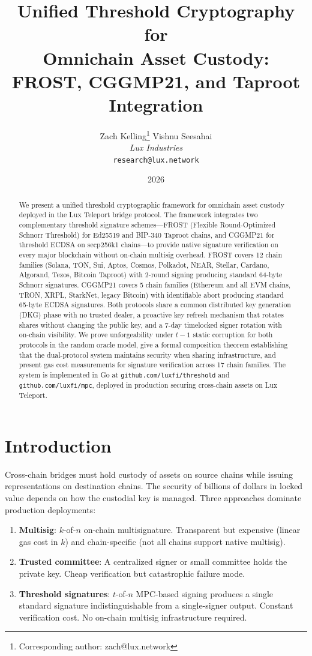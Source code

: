 \documentclass[11pt,twocolumn]{article}
\title{\textbf{Unified Threshold Cryptography for\\Omnichain Asset Custody:\\FROST, CGGMP21, and Taproot Integration}}
\author{
Zach Kelling\thanks{Corresponding author: zach@lux.network}
\quad
Vishnu Seesahai\\
\textit{Lux Industries}\\
\texttt{research@lux.network}
}
\date{2026}
\begin{document}
\luxcoverpage

\begin{abstract}
We present a unified threshold cryptographic framework for omnichain asset custody
deployed in the Lux Teleport bridge protocol. The framework integrates two complementary
threshold signature schemes---FROST (Flexible Round-Optimized Schnorr Threshold) for
Ed25519 and BIP-340 Taproot chains, and CGGMP21 for threshold ECDSA on secp256k1
chains---to provide native signature verification on every major blockchain without
on-chain multisig overhead. FROST covers 12 chain families (Solana, TON, Sui, Aptos,
Cosmos, Polkadot, NEAR, Stellar, Cardano, Algorand, Tezos, Bitcoin Taproot) with
2-round signing producing standard 64-byte Schnorr signatures. CGGMP21 covers 5 chain
families (Ethereum and all EVM chains, TRON, XRPL, StarkNet, legacy Bitcoin) with
identifiable abort producing standard 65-byte ECDSA signatures. Both protocols share a
common distributed key generation (DKG) phase with no trusted dealer, a proactive key
refresh mechanism that rotates shares without changing the public key, and a 7-day
timelocked signer rotation with on-chain visibility. We prove unforgeability under
$t-1$ static corruption for both protocols in the random oracle model, give a formal
composition theorem establishing that the dual-protocol system maintains security when
sharing infrastructure, and present gas cost measurements for signature verification
across 17 chain families. The system is implemented in Go at
\texttt{github.com/luxfi/threshold} and \texttt{github.com/luxfi/mpc}, deployed in
production securing cross-chain assets on Lux Teleport.
\end{abstract}

\section{Introduction}
\label{sec:intro}

Cross-chain bridges must hold custody of assets on source chains while issuing
representations on destination chains. The security of billions of dollars in locked
value depends on how the custodial key is managed. Three approaches dominate
production deployments:

\begin{enumerate}[nosep]
  \item \textbf{Multisig}: $k$-of-$n$ on-chain multisignature. Transparent but
    expensive (linear gas cost in $k$) and chain-specific (not all chains support
    native multisig).
  \item \textbf{Trusted committee}: A centralized signer or small committee holds
    the private key. Cheap verification but catastrophic failure mode.
  \item \textbf{Threshold signatures}: $t$-of-$n$ MPC-based signing produces a
    single standard signature indistinguishable from a single-signer output.
    Constant verification cost. No on-chain multisig infrastructure required.
\end{enumerate}
\end{document}
